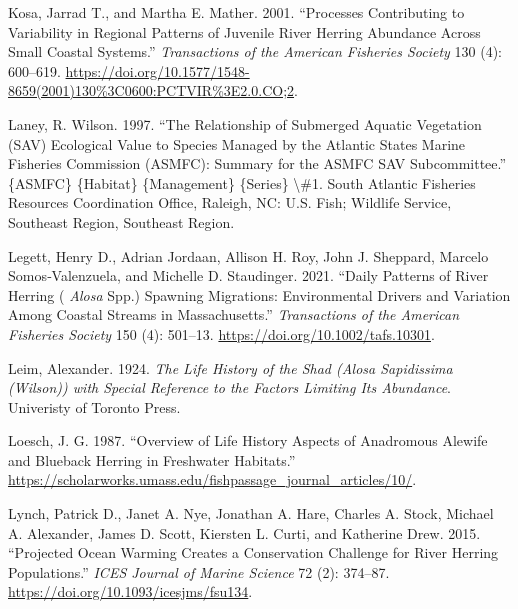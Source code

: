 \documentclass[
]{book}
\newlength{\cslhangindent}
\newlength{\cslentryspacingunit} %
\newenvironment{CSLReferences}[2] %
 {%
  \setlength{\parindent}{0pt}
  \ifodd #1
  \let\oldpar\par
  \def\par{\hangindent=\cslhangindent\oldpar}
  \fi
  \setlength{\parskip}{#2\cslentryspacingunit}
 }%
 {}
\begin{document}
\begin{CSLReferences}{1}{0}
\leavevmode{}%
Kosa, Jarrad T., and Martha E. Mather. 2001. {``Processes {Contributing} to {Variability} in {Regional} {Patterns} of {Juvenile} {River} {Herring} {Abundance} Across {Small} {Coastal} {Systems}.''} \emph{Transactions of the American Fisheries Society} 130 (4): 600--619. \url{https://doi.org/10.1577/1548-8659(2001)130\%3C0600:PCTVIR\%3E2.0.CO;2}.

\leavevmode{}%
Laney, R. Wilson. 1997. {``The {Relationship} of {Submerged} {Aquatic} {Vegetation} ({SAV}) {Ecological} {Value} to {Species} {Managed} by the {Atlantic} {States} {Marine} {Fisheries} {Commission} ({ASMFC}): {Summary} for the {ASMFC} {SAV} {Subcommittee}.''} \{ASMFC\} \{Habitat\} \{Management\} \{Series\} \textbackslash\#1. South Atlantic Fisheries Resources Coordination Office, Raleigh, NC: U.S. Fish; Wildlife Service, Southeast Region, Southeast Region.

\leavevmode{}%
Legett, Henry D., Adrian Jordaan, Allison H. Roy, John J. Sheppard, Marcelo Somos‐Valenzuela, and Michelle D. Staudinger. 2021. {``Daily {Patterns} of {River} {Herring} ( \emph{Alosa} Spp.) {Spawning} {Migrations}: {Environmental} {Drivers} and {Variation} Among {Coastal} {Streams} in {Massachusetts}.''} \emph{Transactions of the American Fisheries Society} 150 (4): 501--13. \url{https://doi.org/10.1002/tafs.10301}.

\leavevmode{}%
Leim, Alexander. 1924. \emph{The {Life} {History} of the {Shad} ({Alosa} {Sapidissima} ({Wilson})) with {Special} {Reference} to the {Factors} {Limiting} {Its} {Abundance}}. Univeristy of Toronto Press.

\leavevmode{}%
Loesch, J. G. 1987. {``Overview of {Life} {History} {Aspects} of {Anadromous} {Alewife} and {Blueback} {Herring} in {Freshwater} {Habitats}.''} \url{https://scholarworks.umass.edu/fishpassage_journal_articles/10/}.

\leavevmode{}%
Lynch, Patrick D., Janet A. Nye, Jonathan A. Hare, Charles A. Stock, Michael A. Alexander, James D. Scott, Kiersten L. Curti, and Katherine Drew. 2015. {``Projected Ocean Warming Creates a Conservation Challenge for River Herring Populations.''} \emph{ICES Journal of Marine Science} 72 (2): 374--87. \url{https://doi.org/10.1093/icesjms/fsu134}.


\end{CSLReferences}
\end{document}
